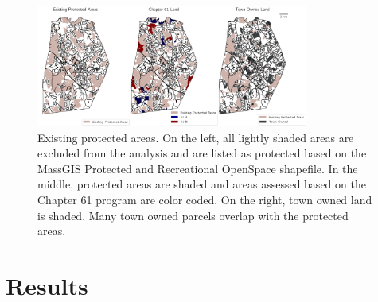 \documentclass[12pt, stu, floatsintext,table]{apa7}
\begin{document}
\begin{figure}[hbtp]
    \centering
    \includegraphics[width = 0.8\textwidth]{figures/existing_prot.png}
    \caption{Existing protected areas. On the left, all lightly shaded areas are excluded from the analysis and are listed as protected based on the MassGIS Protected and Recreational OpenSpace shapefile. In the middle, protected areas are shaded and areas assessed based on the Chapter 61 program are color coded. On the right, town owned land is shaded. Many town owned parcels overlap with the protected areas.}
\end{figure}
\section{Results}
\end{document}
